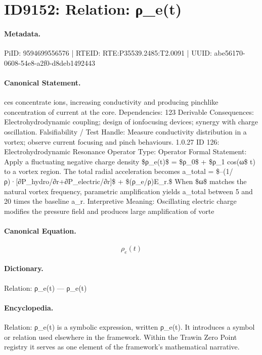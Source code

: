 \section*{ID9152: Relation: ρ\_e(t)}
\paragraph{Metadata.}
PiID: 9594699556576 | RTEID: RTE:P35539.2485:T2.0091 | UUID: abe56170-0608-54e8-a2f0-d8deb1492443

\paragraph{Canonical Statement.}
ces concentrate ions, increasing conductivity and producing pinchlike concentration of current at the core. Dependencies: 123 Derivable Consequences: Electrohydrodynamic coupling; design of ionfocusing devices; synergy with charge oscillation. Falsifiability / Test Handle: Measure conductivity distribution in a vortex; observe current focusing and pinch behaviours. 1.0.27 ID 126: Electrohydrodynamic Resonance Operator Type: Operator Formal Statement: Apply a fluctuating negative charge density \$ρ\_e(t)\$ = \$ρ\_0\$ + \$ρ\_1 cos(ω\$ t) to a vortex region. The total radial acceleration becomes a\_total = \$–(1/ρ)·[∂P\_hydro/∂r+∂P\_electric/∂r]\$ + \$(ρ\_e/ρ)E\_r.\$ When \$ω\$ matches the natural vortex frequency, parametric amplification yields a\_total between 5 and 20 times the baseline a\_r. Interpretive Meaning: Oscillating electric charge modifies the pressure field and produces large amplification of vorte

\paragraph{Canonical Equation.}
\[
ρ_e(t)
\]

\paragraph{Dictionary.}
Relation: ρ\_e(t) — ρ\_e(t)

\paragraph{Encyclopedia.}
Relation: ρ\_e(t) is a symbolic expression, written ρ\_e(t). It introduces a symbol or relation used elsewhere in the framework. Within the Trawin Zero Point registry it serves as one element of the framework's mathematical narrative.
